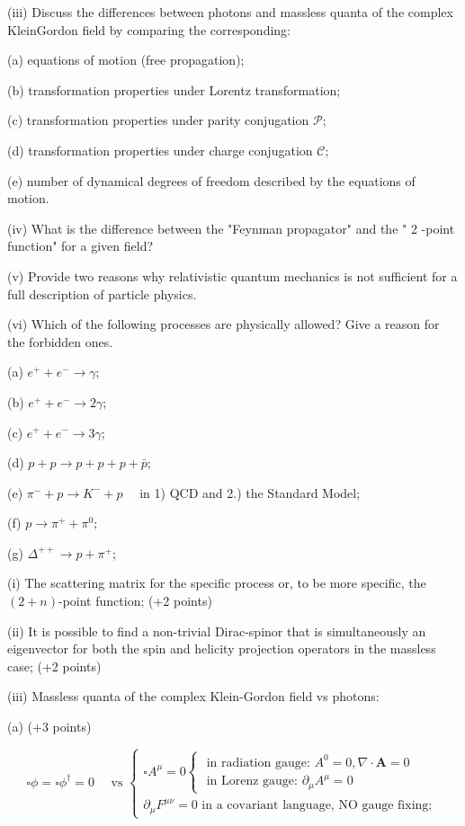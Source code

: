 \documentclass[10pt, letterpaper]{article}
\begin{document}
(iii) Discuss the differences between photons and massless quanta of the complex KleinGordon field by comparing the corresponding:

(a) equations of motion (free propagation);

(b) transformation properties under Lorentz transformation;

(c) transformation properties under parity conjugation $\mathcal{P}$;

(d) transformation properties under charge conjugation $\mathcal{C}$;

(e) number of dynamical degrees of freedom described by the equations of motion.

(iv) What is the difference between the "Feynman propagator" and the " 2 -point function" for a given field?

(v) Provide two reasons why relativistic quantum mechanics is not sufficient for a full description of particle physics.

(vi) Which of the following processes are physically allowed? Give a reason for the forbidden ones.

(a) $e^{+}+e^{-} \rightarrow \gamma$;

(b) $e^{+}+e^{-} \rightarrow 2 \gamma$;

(c) $e^{+}+e^{-} \rightarrow 3 \gamma$;

(d) $p+p \rightarrow p+p+p+\bar{p}$;

(e) $\pi^{-}+p \rightarrow K^{-}+p \quad$ in 1) QCD and 2.) the Standard Model;

(f) $p \rightarrow \pi^{+}+\pi^0$;

(g) $\Delta^{++} \rightarrow p+\pi^{+}$;


(i) The scattering matrix for the specific process or, to be more specific, the $(2+n)$-point function; (+2 points)

(ii) It is possible to find a non-trivial Dirac-spinor that is simultaneously an eigenvector for both the spin and helicity projection operators in the massless case; (+2 points)

(iii) Massless quanta of the complex Klein-Gordon field vs photons:

(a) (+3 points)

$$
\square \phi=\square \phi^{\dagger}=0 \quad \text { vs }\left\{\begin{array}{l}
\square A^\mu=0\left\{\begin{array}{l}
\text { in radiation gauge: } A^0=0, \nabla \cdot \mathbf{A}=0 \\
\text { in Lorenz gauge: } \partial_\mu A^\mu=0
\end{array}\right. \\
\partial_\mu F^{\mu \nu}=0 \text { in a covariant language, NO gauge fixing; }
\end{array}\right.
$$
\end{document}
